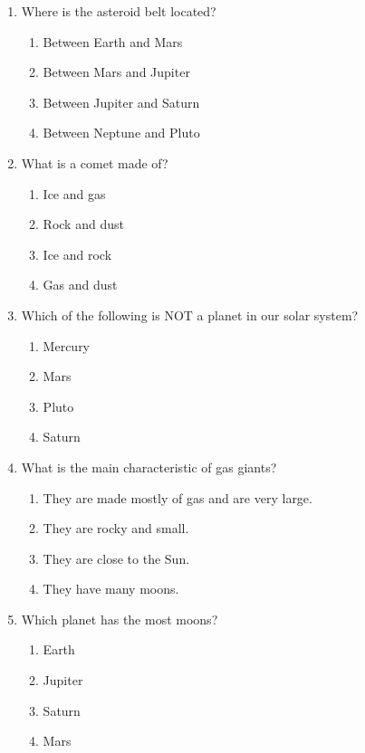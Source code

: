 \documentclass[12pt]{article}
\begin{document}
\begin{enumerate}
    \item Where is the asteroid belt located?
    \begin{enumerate}[label=\Alph*.]
        \item Between Earth and Mars
        \item Between Mars and Jupiter
        \item Between Jupiter and Saturn
        \item Between Neptune and Pluto
    \end{enumerate}
    \vspace{0.5cm}

    \item What is a comet made of?
    \begin{enumerate}[label=\Alph*.]
        \item Ice and gas
        \item Rock and dust
        \item Ice and rock
        \item Gas and dust
    \end{enumerate}
    \vspace{0.5cm}

    \item Which of the following is NOT a planet in our solar system?
    \begin{enumerate}[label=\Alph*.]
        \item Mercury
        \item Mars
        \item Pluto
        \item Saturn
    \end{enumerate}
    \vspace{0.5cm}

    \item What is the main characteristic of gas giants?
    \begin{enumerate}[label=\Alph*.]
        \item They are made mostly of gas and are very large.
        \item They are rocky and small.
        \item They are close to the Sun.
        \item They have many moons.
    \end{enumerate}
    \vspace{0.5cm}

    \item Which planet has the most moons?
    \begin{enumerate}[label=\Alph*.]
        \item Earth
        \item Jupiter
        \item Saturn
        \item Mars
    \end{enumerate}
    \vspace{0.5cm}

\end{enumerate}
\newpage
\end{document}
